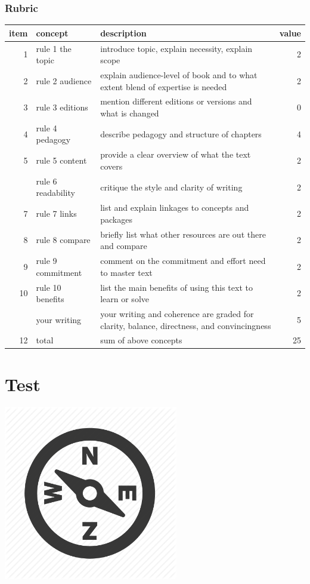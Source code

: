 \documentclass[
]{book}
\begin{document}
\hypertarget{rubric}{%
\subsection*{Rubric}\label{rubric}}

\begin{tabular}{rllr}
\toprule
item & concept & description & value\\
\midrule
1 & rule 1 the topic & introduce topic, explain necessity, explain scope & 2\\
2 & rule 2 audience & explain audience-level of book and to what extent blend of expertise is needed & 2\\
3 & rule 3 editions & mention different editions or versions and what is changed & 0\\
4 & rule 4 pedagogy & describe pedagogy and structure of chapters & 4\\
5 & rule 5 content & provide a clear overview of what the text covers & 2\\
\addlinespace
6 & rule 6 readability & critique the style and clarity of writing & 2\\
7 & rule 7 links & list and explain linkages to concepts and packages & 2\\
8 & rule 8 compare & briefly list what other resources are out there and compare & 2\\
9 & rule 9 commitment & comment on the commitment and effort need to master text & 2\\
10 & rule 10 benefits & list the main benefits of using this text to learn or solve & 2\\
\addlinespace
11 & your writing & your writing and coherence are graded for clarity, balance, directness, and convincingness & 5\\
12 & total & sum of above concepts & 25\\
\bottomrule
\end{tabular}

\hypertarget{test}{%
\chapter{Test}\label{test}}

\includegraphics[width=3in,height=\textheight]{./test.png}
\end{document}
